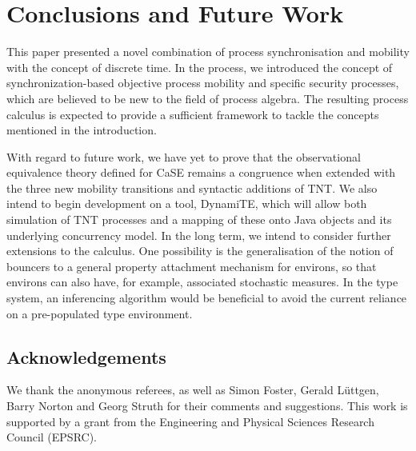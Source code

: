\documentclass[orivec]{llncs}
\begin{document}
\section{Conclusions and Future Work}
\label{futurework}

This paper presented a novel combination of process synchronisation and
mobility with the concept of discrete time.  In the process, we
introduced the concept of synchronization-based objective process
mobility and specific security processes, which are believed to be new
to the field of process algebra.  The resulting process calculus is
expected to provide a sufficient framework to tackle the concepts
mentioned in the introduction.

With regard to future work, we have yet to prove that the observational
equivalence theory defined for CaSE remains a congruence when extended
with the three new mobility transitions and syntactic additions of TNT.  We
also intend to begin development on a tool, DynamiTE, which will allow
both simulation of TNT processes and a mapping of these onto Java
objects and its underlying concurrency model.  In the long term, we
intend to consider further extensions to the calculus.  One possibility
is the generalisation of the notion of bouncers to a general property
attachment mechanism for environs, so that environs can also have, for
example, associated stochastic measures.  In the type system, an
inferencing algorithm would be beneficial to avoid the current reliance
on a pre-populated type environment.

\subsection*{Acknowledgements}

We thank the anonymous referees, as well as Simon Foster, Gerald
L{\"u}ttgen, Barry Norton and Georg Struth for their comments and
suggestions.  This work is supported by a grant from the Engineering and
Physical Sciences Research Council ({EPSRC}).



\end{document}
